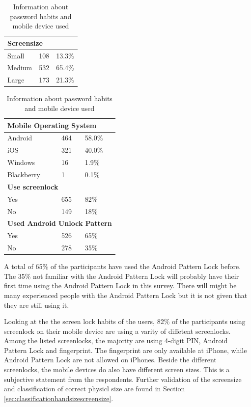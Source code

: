 {{\begin{table}[H]
{\begin{tabular}{ l | l l }
          \multicolumn{3}{l}{\bf Screensize} \\ \hline
          Small & 108 & 13.3\% \\
          Medium & 532 & 65.4\% \\ 
          Large & 173 & 21.3\% \\ \hline
        \end{tabular}
      }
      \hfill
      \parbox{.48\linewidth}{
        \centering
        \begin{tabular}{ l | l l }
          \hline
          \multicolumn{3}{l}{\bf Mobile Operating System} \\ \hline
          Android & 464 & 58.0\% \\
          iOS & 321 & 40.0\% \\
          Windows & 16 & 1.9\% \\
          Blackberry & 1 & 0.1\% \\ \hline

          \multicolumn{3}{l}{\bf Use screenlock} \\ \hline
          Yes & 655 & 82\% \\
          No & 149 & 18\% \\ \hline

          \multicolumn{3}{l}{\bf Used Android Unlock Pattern} \\ \hline
          Yes & 526 & 65\% \\ 
          No & 278 & 35\% \\ \hline
        \end{tabular}
      }
      \caption{Information about password habits and mobile device used}
      \label{tab:screenlockHabits}
    \end{table}


    A total of 65\% of the participants have used the Android Pattern Lock before. The 35\% not familiar with the Android Pattern Lock will probably have their first time using the Android Pattern Lock in this survey. There will might be many experienced people with the Android Pattern Lock but it is not given that they are still using it. 

    Looking at the the screen lock habits of the users, 82\% of the participants using screenlock on their mobile device are using a varity of diffetent screenlocks. Among the listed screenlocks, the majority are using 4-digit PIN, Android Pattern Lock and fingerprint. The fingerprint are only available at iPhone, while Android Pattern Lock are not allowed on iPhones. Beside the different screenlocks, the mobile devices do also have different screen sizes. This is a subjective statement from the respondents. Further validation of the screensize and classification of correct physicl size are found in Section \ref{sec:classificationhandsizescreensize}.

}}
